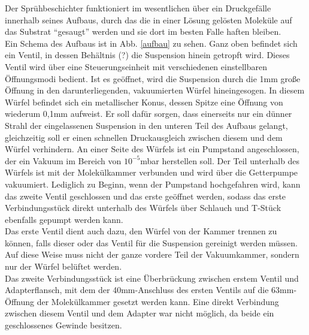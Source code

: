 Der Sprühbeschichter funktioniert im wesentlichen über ein Druckgefälle innerhalb seines Aufbaus, durch das
die in einer Lösung gelösten Moleküle auf das Substrat "`gesaugt"' werden und sie dort im besten
Falle haften bleiben. \\
Ein Schema des Aufbaus ist in Abb. \ref{aufbau} zu sehen. Ganz oben befindet sich ein Ventil, in
dessen Behältnis (?) die Suspension hinein getropft wird. Dieses Ventil wird über eine
Steuerungseinheit mit verschiedenen einstellbaren Öffnungsmodi bedient. Ist es geöffnet, wird
die Suspension durch die 1mm große Öffnung in den darunterliegenden, vakuumierten Würfel hineingesogen. In diesem Würfel
befindet sich ein metallischer Konus, dessen Spitze eine Öffnung von wiederum 0,1mm aufweist. Er
soll dafür sorgen, dass einerseits nur ein dünner Strahl der eingelassenen Suspension in den unteren
Teil des Aufbaus gelangt, gleichzeitig soll er einen schnellen Druckausgleich zwischen diesem und
dem Würfel verhindern. An einer Seite des Würfels ist ein Pumpstand angeschlossen, der ein Vakuum im
Bereich von $10^{-5}$mbar herstellen soll. Der Teil unterhalb des Würfels ist mit der Molekülkammer
verbunden und wird über die Getterpumpe vakuumiert. Lediglich zu Beginn, wenn der Pumpstand
hochgefahren wird, kann das zweite Ventil geschlossen und das erste geöffnet werden, sodass das
erste Verbindungsstück direkt unterhalb des Würfels über Schlauch und T-Stück ebenfalls gepumpt werden
kann.\\
Das erste Ventil dient auch dazu, den Würfel von der Kammer trennen zu können, falls dieser
oder das Ventil für die Suspension gereinigt werden müssen. Auf diese Weise muss nicht der ganze
vordere Teil der Vakuumkammer, sondern nur der Würfel belüftet werden.\\
Das zweite Verbindungsstück ist eine Überbrückung zwischen erstem Ventil und Adapterflansch, mit dem
der 40mm-Anschluss des ersten Ventils %
auf die 63mm-Öffnung der Molekülkammer gesetzt werden kann. Eine direkt Verbindung zwischen diesem
Ventil und dem Adapter war nicht möglich, da beide ein geschlossenes Gewinde besitzen.


